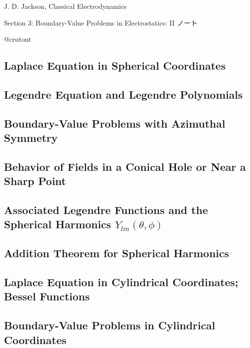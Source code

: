 
\pagestyle{fancy}  
\fancyhead[L]{\rightmark}
\fancyhead[C]{}  
\fancyhead[R]{\textbf{\thepage}}  
\fancyfoot{}
\renewcommand{\headrulewidth}{0.1pt}
\renewcommand{\contentsname}{Contents}

  
\begin{screen}
  \centering
  J. D. Jackson, Classical Electrodynamics

  Section 3: Boundary-Value Problems in Electrostatics: II ノート
\end{screen}
\begin{flushright}  
  @crutont
\end{flushright}

\setcounter{section}{3}
\tableofcontents
\hrulefill
\newpage

\subsection{Laplace Equation in Spherical Coordinates}
\subsection{Legendre Equation and Legendre Polynomials}
\subsection{Boundary-Value Problems with Azimuthal Symmetry}
\subsection{Behavior of Fields in a Conical Hole or Near a Sharp Point}
\subsection{Associated Legendre Functions and the Spherical Harmonics \texorpdfstring{$Y_{lm}(\theta, \phi)$}{}}
\subsection{Addition Theorem for Spherical Harmonics}
\subsection{Laplace Equation in Cylindrical Coordinates; Bessel Functions}
\subsection{Boundary-Value Problems in Cylindrical Coordinates}
